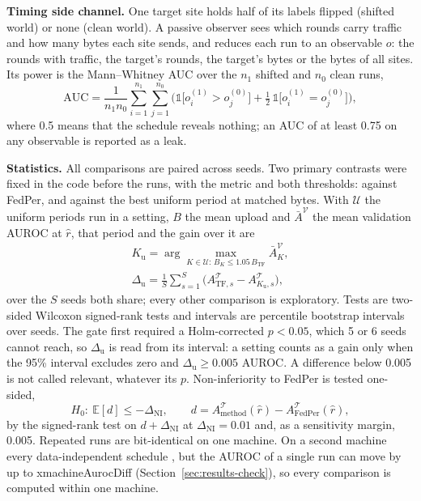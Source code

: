 \textbf{Timing side channel.} One target site holds half of its labels flipped (shifted world) or none (clean world). A passive observer sees which rounds carry traffic and how many bytes each site sends, and reduces each run to an observable $o$: the rounds with traffic, the target's rounds, the target's bytes or the bytes of all sites. Its power is the Mann--Whitney AUC over the $n_1$ shifted and $n_0$ clean runs,
\begin{equation}
\mathrm{AUC}=\frac1{n_1n_0}\sum_{i=1}^{n_1}\sum_{j=1}^{n_0}\Big(\mathbb 1\big[o^{(1)}_i>o^{(0)}_j\big]+\tfrac12\,\mathbb 1\big[o^{(1)}_i=o^{(0)}_j\big]\Big),
\label{eq:auc}
\end{equation}
where 0.5 means that the schedule reveals nothing; an AUC of at least 0.75 on any observable is reported as a leak.

\textbf{Statistics.} All comparisons are paired across seeds. Two primary contrasts were fixed in the code before the runs, with the metric and both thresholds: \tierfed{} against FedPer, and \tierfed{} against the best uniform period at matched bytes. With $\mathcal U$ the uniform periods run in a setting, $B$ the mean upload and $\bar A^{\mathcal V}$ the mean validation AUROC at $\hat r$, that period and the gain over it are
\begin{equation}
\begin{gathered}
K_{\mathrm u}=\arg\max_{K\in\mathcal U:\,B_K\le1.05\,B_{\mathrm{TF}}}\bar A^{\mathcal V}_K,\\
\Delta_{\mathrm u}=\frac1S\sum_{s=1}^{S}\big(A^{\mathcal T}_{\mathrm{TF},s}-A^{\mathcal T}_{K_{\mathrm u},s}\big),
\end{gathered}
\label{eq:gate}
\end{equation}
over the $S$ seeds both share; every other comparison is exploratory. Tests are two-sided Wilcoxon signed-rank tests and intervals are percentile bootstrap intervals over seeds. The gate first required a Holm-corrected $p<0.05$, which 5 or 6 seeds cannot reach, so $\Delta_{\mathrm u}$ is read from its interval: a setting counts as a gain only when the 95\% interval excludes zero and $\Delta_{\mathrm u}\ge0.005$ AUROC. A difference below 0.005 is not called relevant, whatever its $p$. Non-inferiority to FedPer is tested one-sided,
\begin{equation}
H_0:\ \mathbb E[d]\le-\Delta_{\mathrm{NI}},\qquad d=A^{\mathcal T}_{\text{method}}(\hat r)-A^{\mathcal T}_{\text{FedPer}}(\hat r),
\label{eq:ni}
\end{equation}
by the signed-rank test on $d+\Delta_{\mathrm{NI}}$ at $\Delta_{\mathrm{NI}}=0.01$ and, as a sensitivity margin, 0.005. Repeated runs are bit-identical on one machine. On a second machine every data-independent schedule , but the AUROC of a single run can move by up to \num{xmachineAurocDiff} (Section~\ref{sec:results-check}), so every comparison is computed within one machine.
